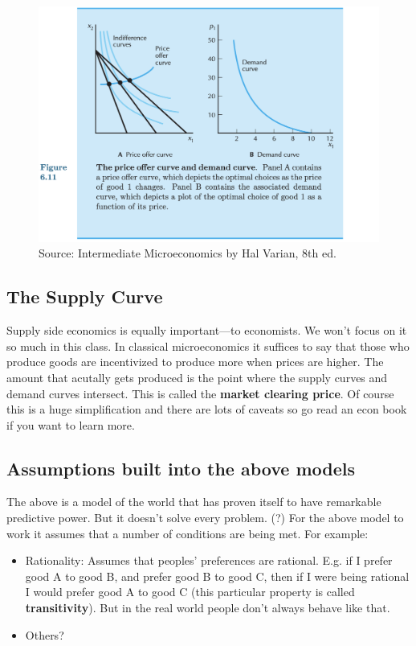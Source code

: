 \documentclass[11pt]{article}
\begin{document}
\begin{figure}[h]
    \centering
    \includegraphics*[width=4.5in]{demandcurve.png}
    \caption{Source: Intermediate Microeconomics by Hal Varian, 8th ed.}
    \label{fig:demand}
\end{figure}

\subsection{The Supply Curve}

Supply side economics is equally important---to economists. We won't focus on it so much in this class. In classical microeconomics it suffices to say that those who produce goods are incentivized to produce more when prices are higher. The amount that acutally gets produced is the point where the supply curves and demand curves intersect. This is called the {\bf market clearing price}. Of course this is a huge simplification and there are lots of caveats so go read an econ book if you want to learn more. 


\subsection{Assumptions built into the above models}

The above is a model of the world that has proven itself to have remarkable predictive power.
But it doesn't solve every problem. (?)
For the above model to work it assumes that a number of conditions are being met. For example:

\begin{itemize}
    \item Rationality: Assumes that peoples' preferences are rational. E.g. if I prefer good A to good B, and prefer good B to good C, then if I were being rational I would prefer good A to good C (this particular property is called {\bf transitivity}). But in the real world people don't always behave like that.
    \item Others? 
\end{itemize}
\end{document}
